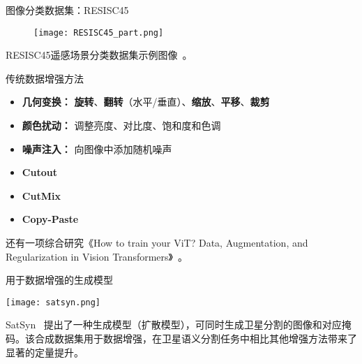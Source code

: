 \begin{refsection}
  \begin{frame}{图像分类数据集：RESISC45}
    \begin{figure}
      \centering
      \texttt{[image: RESISC45\_part.png]}
    \end{figure}
    \scriptsize
    RESISC45遥感场景分类数据集示例图像~\parencite{Cheng2017}。
    \bottomleftrefs
  \end{frame}
\end{refsection}

\begin{refsection}
  \begin{frame}{传统数据增强方法}
    \begin{itemize}
      \item \textbf{几何变换：} \textbf{旋转}、\textbf{翻转}（水平/垂直）、\textbf{缩放}、\textbf{平移}、\textbf{裁剪}
      \item \textbf{颜色扰动：} 调整亮度、对比度、饱和度和色调
      \item \textbf{噪声注入：} 向图像中添加随机噪声
      \item \textbf{Cutout}~\parencite{devriesImprovedRegularizationConvolutional2017}
      \item \textbf{CutMix}~\parencite{yunCutMixRegularizationStrategy2019}
      \item \textbf{Copy-Paste}~\parencite{ghiasiSimpleCopyPasteStrong2021}
    \end{itemize}
    还有一项综合研究《How to train your ViT? Data, Augmentation,  and Regularization in Vision Transformers》~\parencite{steinerHowTrainYour2022}。
    \bottomleftrefs
  \end{frame}
\end{refsection}

\begin{refsection}
  \begin{frame}{用于数据增强的生成模型}
    \begin{minipage}{0.7\linewidth}
      \texttt{[image: satsyn.png]}
    \end{minipage}%
    \hfill
    \begin{minipage}{0.3\linewidth}
      \scriptsize
      SatSyn~\parencite{tokerSatSynthAugmentingImageMask2024} 提出了一种生成模型（扩散模型），可同时生成卫星分割的图像和对应掩码。该合成数据集用于数据增强，在卫星语义分割任务中相比其他增强方法带来了显著的定量提升。
    \end{minipage}
    \bottomleftrefs
  \end{frame}
\end{refsection}

